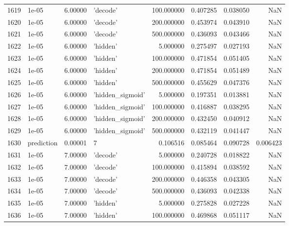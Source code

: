\documentclass[10pt,a4paper]{article}
\begin{document}
\begin{tabular}{llrlrrrr}
1619 &       1e-05 &   6.00000 &           'decode' &  100.000000 &  0.407285 &  0.038050 &       NaN \\
1620 &       1e-05 &   6.00000 &           'decode' &  200.000000 &  0.453974 &  0.043910 &       NaN \\
1621 &       1e-05 &   6.00000 &           'decode' &  500.000000 &  0.436093 &  0.043466 &       NaN \\
1622 &       1e-05 &   6.00000 &           'hidden' &    5.000000 &  0.275497 &  0.027193 &       NaN \\
1623 &       1e-05 &   6.00000 &           'hidden' &  100.000000 &  0.471854 &  0.051405 &       NaN \\
1624 &       1e-05 &   6.00000 &           'hidden' &  200.000000 &  0.471854 &  0.051489 &       NaN \\
1625 &       1e-05 &   6.00000 &           'hidden' &  500.000000 &  0.455629 &  0.047376 &       NaN \\
1626 &       1e-05 &   6.00000 &   'hidden\_sigmoid' &    5.000000 &  0.197351 &  0.013881 &       NaN \\
1627 &       1e-05 &   6.00000 &   'hidden\_sigmoid' &  100.000000 &  0.416887 &  0.038295 &       NaN \\
1628 &       1e-05 &   6.00000 &   'hidden\_sigmoid' &  200.000000 &  0.432450 &  0.040912 &       NaN \\
1629 &       1e-05 &   6.00000 &   'hidden\_sigmoid' &  500.000000 &  0.432119 &  0.041447 &       NaN \\
1630 &  prediction &   0.00001 &                  7 &    0.106516 &  0.085464 &  0.090728 &  0.006423 \\
1631 &       1e-05 &   7.00000 &           'decode' &    5.000000 &  0.240728 &  0.018822 &       NaN \\
1632 &       1e-05 &   7.00000 &           'decode' &  100.000000 &  0.415894 &  0.038592 &       NaN \\
1633 &       1e-05 &   7.00000 &           'decode' &  200.000000 &  0.446358 &  0.043305 &       NaN \\
1634 &       1e-05 &   7.00000 &           'decode' &  500.000000 &  0.436093 &  0.042338 &       NaN \\
1635 &       1e-05 &   7.00000 &           'hidden' &    5.000000 &  0.275828 &  0.027228 &       NaN \\
1636 &       1e-05 &   7.00000 &           'hidden' &  100.000000 &  0.469868 &  0.051117 &       NaN \\

\end{tabular}
\end{document}
